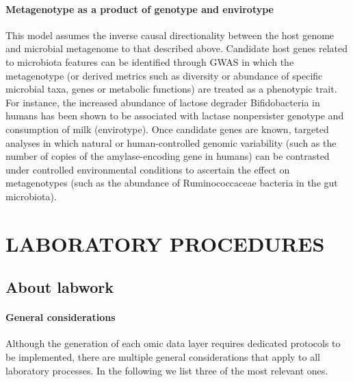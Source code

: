 \documentclass[
]{book}
\begin{document}
\hypertarget{m-g-e}{%
\subsection*{Metagenotype as a product of genotype and envirotype}\label{m-g-e}}

This model assumes the inverse causal directionality between the host genome and microbial metagenome to that described above. Candidate host genes related to microbiota features can be identified through GWAS in which the metagenotype (or derived metrics such as diversity or abundance of specific microbial taxa, genes or metabolic functions) are treated as a phenotypic trait. For instance, the increased abundance of lactose degrader Bifidobacteria in humans has been shown to be associated with lactase nonpersister genotype and consumption of milk (envirotype). Once candidate genes are known, targeted analyses in which natural or human-controlled genomic variability (such as the number of copies of the amylase-encoding gene in humans) can be contrasted under controlled environmental conditions to ascertain the effect on metagenotypes (such as the abundance of Ruminococcaceae bacteria in the gut microbiota).

\hypertarget{part-laboratory-procedures}{%
\part{LABORATORY PROCEDURES}\label{part-laboratory-procedures}}

\hypertarget{about-labwork}{%
\chapter{About labwork}\label{about-labwork}}

\hypertarget{laboratory-general-considerations}{%
\subsection*{General considerations}\label{laboratory-general-considerations}}

Although the generation of each omic data layer requires dedicated protocols to be implemented, there are multiple general considerations that apply to all laboratory processes. In the following we list three of the most relevant ones.
\end{document}
